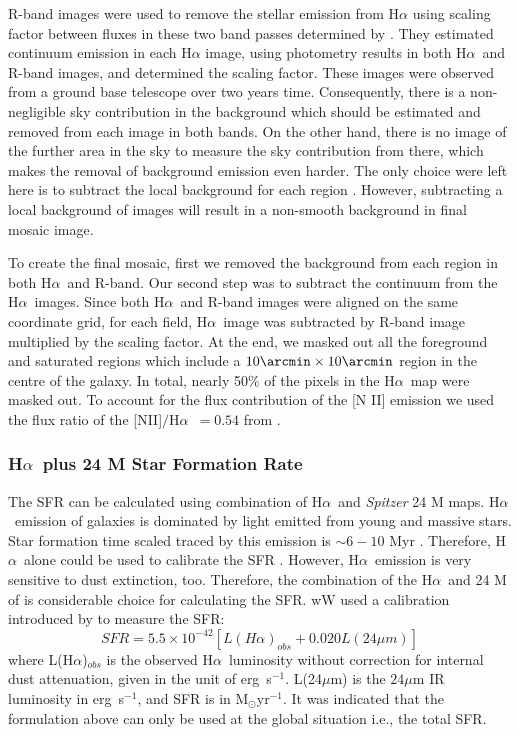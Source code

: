 \documentclass[useAMS,usenatbib]{mn2e}
\newcommand \halpha    {H$\alpha $\ }
\newcommand \Spitzer {{\it Spitzer }}
\begin{document}
 R-band images were used to remove the stellar emission from H$\alpha$ using scaling factor between fluxes in these two band passes determined by \cite{Azimlu11}. They estimated continuum emission in each H$\alpha$ image, using photometry results in both \halpha and R-band images, and determined the scaling factor. These images were observed from a ground base telescope over two years time. Consequently, there is a non-negligible sky contribution in the background which should be estimated and removed from each image in both bands. On the other hand, there is no image of the further area in the sky to measure the sky contribution from there, which makes the removal of background emission even harder. The only choice were left here is to subtract the local background for each region%
. However, subtracting a local background of images will result in a non-smooth background in final mosaic image. 

To create the final mosaic, first we removed the background from each region in both \halpha and R-band. Our second step was to subtract the continuum from the \halpha images. Since both \halpha and R-band images were aligned on the same coordinate grid, for each field, \halpha image was subtracted by R-band image multiplied by the scaling factor. At the end, we masked out all the foreground and saturated regions which include a $10\arcmin \times 10\arcmin$ region in the centre of the galaxy. In total, nearly 50$\%$ of the pixels in the \halpha map were masked out. To account for the flux contribution of the [N II] emission we used the flux ratio of the [NII]$/$\halpha $= 0.54$ from \cite{Kennicutt08}.


\subsubsection{\halpha plus 24 M Star Formation Rate}
\label{sec:sfr_halpha}

The SFR can be calculated using combination of \halpha and \Spitzer  24 M maps. \halpha emission of galaxies is dominated by light emitted from young and massive stars. Star formation time scaled traced by this emission is $\sim 6-10$ Myr \citep[e.g.,][]{Kennicutt09, Calzetti13}. Therefore, \halpha alone could be used to calibrate the SFR \citep[e.g.,][]{Osterbrock06, Kennicutt09}. However, \halpha emission is very sensitive to dust extinction, too. Therefore, the combination of the \halpha and 24 M of is considerable choice for calculating the SFR. wW used a calibration introduced by \cite{Kennicutt09} to measure the SFR:
\begin{equation}
\label{equ: halphaplus24_g}
SFR = 5.5 \times 10^{-42}[L(H{\alpha})_{obs} + 0.020L(24\mu m)]
\end{equation}
where L(H${\alpha}$)$_{obs}$ is the observed \halpha luminosity without correction for internal dust attenuation, given in the unit of erg~s$^{-1}$. L(24$\mu$m) is the $24\mu$m IR luminosity in erg~s$^{-1}$, and SFR is in M$_{\odot}$yr$^{-1}$. It was indicated that the formulation above can only be used at the global situation i.e., the total SFR.
\end{document}
